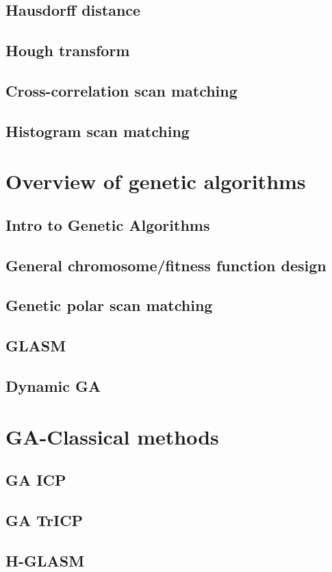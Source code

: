 \documentclass[authoryearcitations]{UoYCSproject}
\begin{document}
\subsection{Hausdorff distance}
\subsection{Hough transform}
\subsection{Cross-correlation scan matching}
\subsection{Histogram scan matching}

\section{Overview of genetic algorithms}
\subsection{Intro to Genetic Algorithms}
\subsection{General chromosome/fitness function design}
\subsection{Genetic polar scan matching}
\subsection{GLASM}
\subsection{Dynamic GA}

\section{GA-Classical methods}
\subsection{GA ICP}
\subsection{GA TrICP}
\subsection{H-GLASM}
\cleardoublepage



\end{document}
